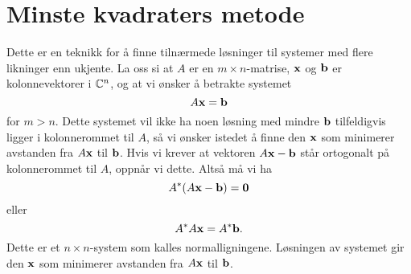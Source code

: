 \section*{Minste kvadraters metode}
Dette er en teknikk for å finne tilnærmede løsninger til systemer med flere likninger enn ukjente. 
La oss si at $A$ er en $m \times n$-matrise, $\mathbf{x}$ og $\mathbf{b}$ er kolonnevektorer i $\mathbb{C}^n$, og at vi ønsker å betrakte systemet
\[
A\mathbf{x}=\mathbf{b}
\]
for $m>n$. Dette systemet vil ikke ha noen løsning med mindre $\mathbf{b}$ tilfeldigvis ligger i kolonnerommet til $A$, 
så vi ønsker istedet å finne den $\mathbf{x}$ som minimerer avstanden fra $A\mathbf{x}$ til $\mathbf{b}$. 
Hvis vi krever at vektoren $A\mathbf{x}-\mathbf{b}$ står ortogonalt på kolonnerommet til $A$, oppnår vi dette. Altså må vi ha
\[
A^*(A\mathbf{x}-\mathbf{b})=\mathbf{0}
\]
eller 
\[
A^*A\mathbf{x}=A^*\mathbf{b}.
\]
Dette er et $n \times n$-system som kalles normalligningene. Løsningen av systemet gir den $\mathbf{x}$ som minimerer avstanden fra $A\mathbf{x}$ til $\mathbf{b}$.
